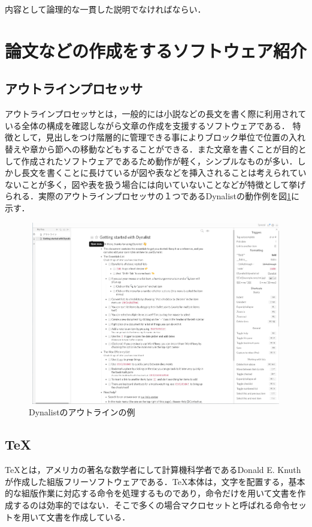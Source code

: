 \documentclass[a4j,12pt]{jarticle}
\begin{document}
内容として論理的な一貫した説明でなければならい．

\newpage

\section{論文などの作成をするソフトウェア紹介}
\subsection{アウトラインプロセッサ}
アウトラインプロセッサとは，一般的には小説などの長文を書く際に利用されている全体の構成を確認しながら文章の作成を支援するソフトウェアである．
特徴として，見出しをつけ階層的に管理できる事によりブロック単位で位置の入れ替えや章から節への移動などもすることができる．また文章を書くことが目的として作成されたソフトウェアであるため動作が軽く，シンプルなものが多い．しかし長文を書くことに長けているが図や表などを挿入されることは考えられていないことが多く，図や表を扱う場合には向いていないことなどが特徴として挙げられる．実際のアウトラインプロセッサの１つであるDynalistの動作例を図\ref{fig:b}に示す．
\begin{figure}[H]
\begin{center}
 \includegraphics[clip,width=130mm,height=80mm]{figure/Dynalist.png}
 \end{center}
 \caption{Dynalistのアウトラインの例}
 \label{fig:b}
\end{figure}
\newpage
\subsection{\TeX}
\TeX とは，アメリカの著名な数学者にして計算機科学者であるDonald E. Knuthが作成した組版フリーソフトウェアである．\TeX 本体は，文字を配置する，基本的な組版作業に対応する命令を処理するものであり，命令だけを用いて文書を作成するのは効率的ではない．そこで多くの場合マクロセットと呼ばれる命令セットを用いて文書を作成している．
\end{document}
